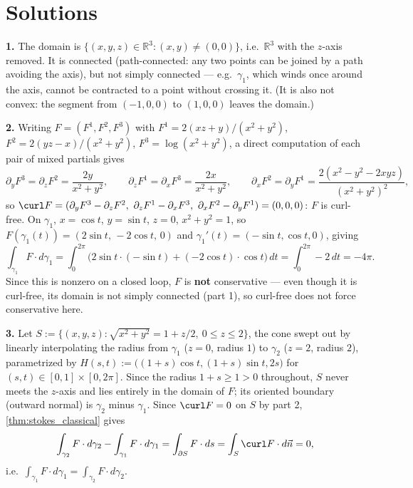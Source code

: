 \section{Solutions}
\label{sec:week12_solutions}

\begin{exercisesolution}
\textbf{1.} The domain is $\{(x,y,z) \in \mathbb{R}^3 : (x,y) \neq (0,0)\}$, i.e.\
$\mathbb{R}^3$ with the $z$-axis removed. It is connected (path-connected: any two points can
be joined by a path avoiding the axis), but not simply connected --- e.g.\ $\gamma_1$, which
winds once around the axis, cannot be contracted to a point without crossing it. (It is also
not convex: the segment from $(-1,0,0)$ to $(1,0,0)$ leaves the domain.)

\textbf{2.} Writing $F = (F^1,F^2,F^3)$ with $F^1 = 2(xz+y)/(x^2+y^2)$, $F^2 =
2(yz-x)/(x^2+y^2)$, $F^3 = \log(x^2+y^2)$, a direct computation of each pair of mixed
partials gives
\[\partial_y F^3 = \partial_z F^2 = \frac{2y}{x^2+y^2}, \qquad
  \partial_z F^1 = \partial_x F^3 = \frac{2x}{x^2+y^2}, \qquad
  \partial_x F^2 = \partial_y F^1 = \frac{2(x^2-y^2-2xyz)}{(x^2+y^2)^2},\]
so $\curl F = (\partial_yF^3-\partial_zF^2,\ \partial_zF^1-\partial_xF^3,\ \partial_xF^2-
\partial_yF^1) = (0,0,0)$: $F$ is curl-free. On $\gamma_1$, $x=\cos t$, $y=\sin t$, $z=0$,
$x^2+y^2=1$, so $F(\gamma_1(t)) = (2\sin t,\,-2\cos t,\,0)$ and $\gamma_1'(t) = (-\sin t,
\cos t,0)$, giving
\[\int_{\gamma_1} F\cdot d\gamma_1 = \int_0^{2\pi} \big(2\sin t\cdot(-\sin t) + (-2\cos t)
  \cdot\cos t\big)\,dt = \int_0^{2\pi} -2\,dt = -4\pi.\]
Since this is nonzero on a closed loop, $F$ is \textbf{not} conservative --- even though it is
curl-free, its domain is not simply connected (part 1), so curl-free does not force
conservative here.

\textbf{3.} Let $S := \{(x,y,z) : \sqrt{x^2+y^2} = 1+z/2,\ 0\leq z\leq2\}$, the cone swept out
by linearly interpolating the radius from $\gamma_1$ ($z=0$, radius $1$) to $\gamma_2$ ($z=2$,
radius $2$), parametrized by $H(s,t) := \big((1+s)\cos t,(1+s)\sin t,2s\big)$ for $(s,t) \in
[0,1]\times[0,2\pi]$. Since the radius $1+s \geq 1 > 0$ throughout, $S$ never meets the
$z$-axis and lies entirely in the domain of $F$; its oriented boundary (outward normal) is
$\gamma_2$ minus $\gamma_1$. Since $\curl F = 0$ on $S$ by part 2, \cref{thm:stokes_classical}
gives
\[\int_{\gamma_2} F\cdot d\gamma_2 - \int_{\gamma_1} F\cdot d\gamma_1 = \int_{\partial S}
  F\cdot ds = \int_S \curl F\cdot d\vec n = 0,\]
i.e.\ $\int_{\gamma_1} F\cdot d\gamma_1 = \int_{\gamma_2} F\cdot d\gamma_2$.


\end{exercisesolution}
